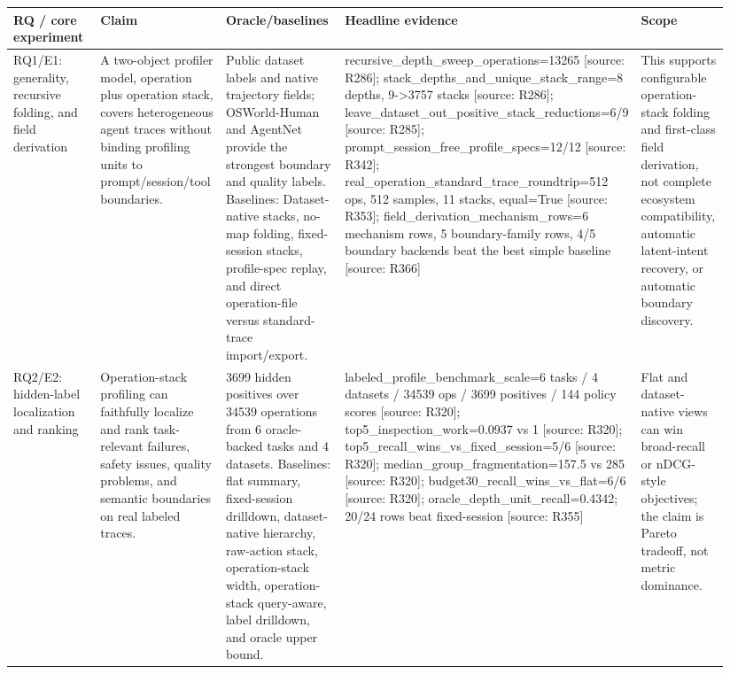 \begin{tabular}{p{0.16\linewidth}p{0.20\linewidth}p{0.20\linewidth}p{0.24\linewidth}p{0.14\linewidth}}
  \toprule
  RQ / core experiment & Claim & Oracle/baselines & Headline evidence & Scope \\
  \midrule
  RQ1/E1: generality, recursive folding, and field derivation & A two-object profiler model, operation plus operation stack, covers heterogeneous agent traces without binding profiling units to prompt/session/tool boundaries. & Public dataset labels and native trajectory fields; OSWorld-Human and AgentNet provide the strongest boundary and quality labels. Baselines: Dataset-native stacks, no-map folding, fixed-session stacks, profile-spec replay, and direct operation-file versus standard-trace import/export. & recursive\_depth\_sweep\_operations=13265 [source: R286]; stack\_depths\_and\_unique\_stack\_range=8 depths, 9->3757 stacks [source: R286]; leave\_dataset\_out\_positive\_stack\_reductions=6/9 [source: R285]; prompt\_session\_free\_profile\_specs=12/12 [source: R342]; real\_operation\_standard\_trace\_roundtrip=512 ops, 512 samples, 11 stacks, equal=True [source: R353]; field\_derivation\_mechanism\_rows=6 mechanism rows, 5 boundary-family rows, 4/5 boundary backends beat the best simple baseline [source: R366] & This supports configurable operation-stack folding and first-class field derivation, not complete ecosystem compatibility, automatic latent-intent recovery, or automatic boundary discovery. \\
  RQ2/E2: hidden-label localization and ranking & Operation-stack profiling can faithfully localize and rank task-relevant failures, safety issues, quality problems, and semantic boundaries on real labeled traces. & 3699 hidden positives over 34539 operations from 6 oracle-backed tasks and 4 datasets. Baselines: flat summary, fixed-session drilldown, dataset-native hierarchy, raw-action stack, operation-stack width, operation-stack query-aware, label drilldown, and oracle upper bound. & labeled\_profile\_benchmark\_scale=6 tasks / 4 datasets / 34539 ops / 3699 positives / 144 policy scores [source: R320]; top5\_inspection\_work=0.0937 vs 1 [source: R320]; top5\_recall\_wins\_vs\_fixed\_session=5/6 [source: R320]; median\_group\_fragmentation=157.5 vs 285 [source: R320]; budget30\_recall\_wins\_vs\_flat=6/6 [source: R320]; oracle\_depth\_unit\_recall=0.4342; 20/24 rows beat fixed-session [source: R355] & Flat and dataset-native views can win broad-recall or nDCG-style objectives; the claim is Pareto tradeoff, not metric dominance. \\

\end{tabular}
